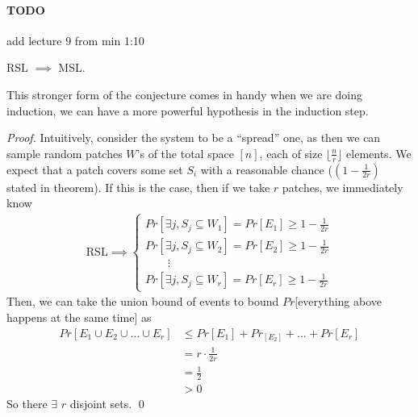 \paragraph{TODO} add lecture 9 from min 1:10

\begin{proposition}
	RSL $\implies$ MSL. 
\end{proposition}
This stronger form of the conjecture comes in handy when we are doing induction, we can have a more powerful hypothesis in the induction step. 

\begin{proof}
	Intuitively, consider the system to be a ``spread'' one, as then we can sample random patches $W$'s of the total space $[n]$, each of size $\lfloor \frac{n}{r} \rfloor$ elements. We expect that a patch covers some set $S_i$ with a reasonable chance ($(1 - \frac{1}{2r})$ stated in theorem). If this is the case, then if we take $r$ patches, we immediately know
	\begin{align}
		\text{RSL} \implies 
		\begin{cases}
			Pr[\exists j, S_j \subseteq W_1] = Pr[E_1] \geq 1 - \frac{1}{2r} \\
			Pr[\exists j, S_j \subseteq W_2] = Pr[E_2] \geq 1 - \frac{1}{2r} \\
			\quad \quad \vdots \\
			Pr[\exists j, S_j \subseteq W_r] = Pr[E_r] \geq 1 - \frac{1}{2r} 
		\end{cases}
	\end{align}
	Then, we can take the union bound of events to bound $Pr$[everything above happens at the same time] as 
	\begin{align}
		Pr[E_1 \cup E_2 \cup \dots \cup E_r] 
		&\leq Pr[E_1] + Pr_[E_2] + \dots + Pr[E_r] \\
		&= r \cdot \frac{1}{2r} \\
		&= \frac{1}{2} \\
		&> 0
	\end{align}
	So there $\exists$ $r$ disjoint sets. \qed
\end{proof}




















































